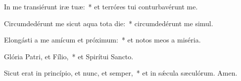 \item In me transiérunt iræ tuæ:~* et terróres tui conturbavérunt me.

\item Circumdedérunt me sicut aqua tota die:~* circumdedérunt me simul.

\item Elongásti a me amícum et próximum:~* et notos meos a miséria.

\item Glória Patri, et Fílio,~* et Spirítui Sancto.

\item Sicut erat in princípio, et nunc, et semper,~* et in sǽcula sæculórum. Amen.

